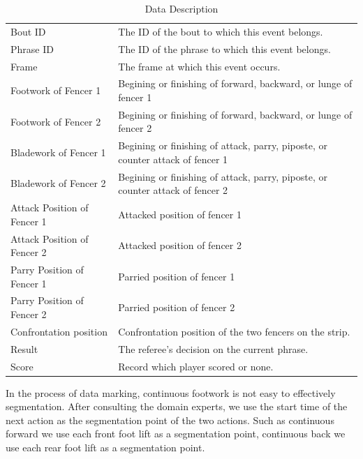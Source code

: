 \documentclass[journal]{vgtc}                %
\begin{document}
\begin{table}[]
	\centering
	\caption{Data Description}
	\label{my-label}
	\begin{tabular}{|p{2cm}|p{4cm}|}
		\cline{1-2}
		Bout ID  &  The ID of the bout to which this event belongs.\\	\cline{1-2}
		Phrase ID  & The ID of the phrase to which this event belongs.\\	\cline{1-2}
		Frame  &  The frame at which this event occurs.\\	\cline{1-2}
		Footwork of Fencer 1  & Begining or finishing of forward, backward, or lunge of fencer 1\\ 	\cline{1-2}
		Footwork of Fencer 2  & Begining or finishing of forward, backward, or lunge of fencer 2\\ 	\cline{1-2}
		Bladework of Fencer 1  & Begining or finishing of attack, parry, piposte, or counter attack of fencer 1\\ 	\cline{1-2}
		Bladework of Fencer 2  & Begining or finishing of attack, parry, piposte, or counter attack of fencer 2\\ 	\cline{1-2}
		Attack Position of Fencer 1  & Attacked position of fencer 1\\ 	\cline{1-2}
		Attack Position of Fencer 2  & Attacked position of fencer 2\\ 	\cline{1-2}
		Parry Position of Fencer 1  & Parried position of fencer 1\\ 	\cline{1-2}
		Parry Position of Fencer 2  & Parried position of fencer 2\\ 	\cline{1-2}
		Confrontation position  & Confrontation position of the two fencers on the strip.\\ 	\cline{1-2}
		Result  & The referee's decision on the current phrase.\\ 	\cline{1-2}
		Score  & Record which player scored or none.\\ 	\cline{1-2}
	\end{tabular}
\end{table}

In the process of data marking, continuous footwork is not easy to effectively segmentation.
After consulting the domain experts, we use the start time of the next action as the segmentation point of the two actions.
Such as continuous forward we use each front foot lift as a segmentation point, continuous back we use each rear foot lift as a segmentation point.
\end{document}
